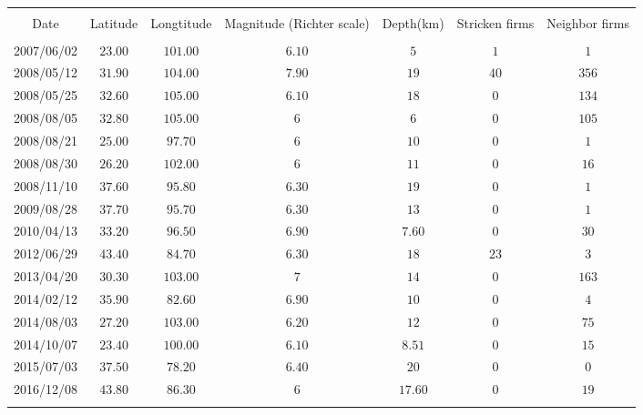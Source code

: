 
\begin{table}[!htbp] \centering 
  \caption{} 
  \label{} 
\begin{tabular}{@{\extracolsep{5pt}} ccccccc} 
\\[-1.8ex]\hline 
\hline \\[-1.8ex] 
Date & Latitude & Longtitude & Magnitude (Richter scale) & Depth(km) & Stricken firms & Neighbor firms \\ 
\hline \\[-1.8ex] 
2007/06/02 & $23.00$ & $101.00$ & $6.10$ & $5$ & $1$ & $1$ \\ 
2008/05/12 & $31.90$ & $104.00$ & $7.90$ & $19$ & $40$ & $356$ \\ 
2008/05/25 & $32.60$ & $105.00$ & $6.10$ & $18$ & $0$ & $134$ \\ 
2008/08/05 & $32.80$ & $105.00$ & $6$ & $6$ & $0$ & $105$ \\ 
2008/08/21 & $25.00$ & $97.70$ & $6$ & $10$ & $0$ & $1$ \\ 
2008/08/30 & $26.20$ & $102.00$ & $6$ & $11$ & $0$ & $16$ \\ 
2008/11/10 & $37.60$ & $95.80$ & $6.30$ & $19$ & $0$ & $1$ \\ 
2009/08/28 & $37.70$ & $95.70$ & $6.30$ & $13$ & $0$ & $1$ \\ 
2010/04/13 & $33.20$ & $96.50$ & $6.90$ & $7.60$ & $0$ & $30$ \\ 
2012/06/29 & $43.40$ & $84.70$ & $6.30$ & $18$ & $23$ & $3$ \\ 
2013/04/20 & $30.30$ & $103.00$ & $7$ & $14$ & $0$ & $163$ \\ 
2014/02/12 & $35.90$ & $82.60$ & $6.90$ & $10$ & $0$ & $4$ \\ 
2014/08/03 & $27.20$ & $103.00$ & $6.20$ & $12$ & $0$ & $75$ \\ 
2014/10/07 & $23.40$ & $100.00$ & $6.10$ & $8.51$ & $0$ & $15$ \\ 
2015/07/03 & $37.50$ & $78.20$ & $6.40$ & $20$ & $0$ & $0$ \\ 
2016/12/08 & $43.80$ & $86.30$ & $6$ & $17.60$ & $0$ & $19$ \\ 
\hline \\[-1.8ex] 
\end{tabular} 
\end{table} 
